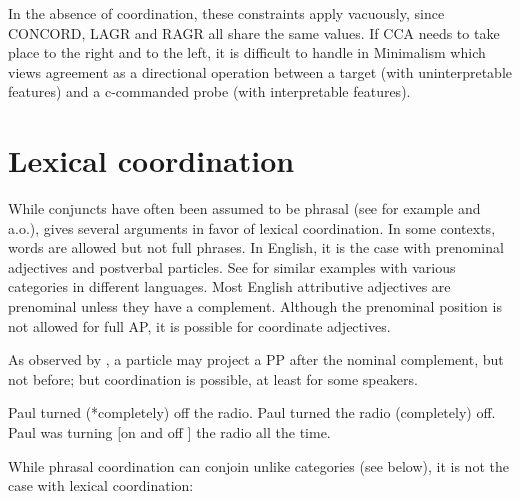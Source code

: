 \documentclass[output=paper
                ,modfonts
                ,nonflat
	        ,collection
	        ,collectionchapter
	        ,collectiontoclongg
 	        ,biblatex
                ,babelshorthands
                ,newtxmath
                ,draftmode
                ,colorlinks, citecolor=brown
]{./langsci/langscibook}
\begin{document}
\noindent
In the absence of coordination, these constraints apply vacuously, since CONCORD, LAGR and RAGR all share the same values.
If CCA needs to take place to the right and to the left, it is difficult to handle in Minimalism which views agreement as a directional operation between a target (with uninterpretable features) and a c-commanded probe (with interpretable features). 


\section{Lexical coordination}\label{lexcoord}


While conjuncts have often been assumed to be phrasal (see for example \citet{Kayne:94} and \citet{bruening} a.o.), \citet{Abeille:06} gives several arguments in favor of lexical coordination.
In some contexts, words are allowed but not full phrases. In English, it is the case with prenominal adjectives and postverbal particles. See \citet{Abeille:06} for similar examples with various categories in different languages. Most English attributive adjectives are prenominal unless they have a complement. Although the prenominal position is not allowed for full AP, it is possible for coordinate adjectives.

\begin{exe}
 \ex
\begin{xlista}
\end{xlista}
\end{exe}

As observed by \citet{hpsg1}, a particle may project a  PP  after the nominal complement, but not before; but coordination is possible, at least for some speakers.

\begin{exe}
 \ex
\begin{xlista}
\ex Paul turned (*completely) off the radio.
\ex Paul turned the radio (completely) off.
\ex Paul was turning [on and off ] the radio all the time.
\end{xlista}
\end{exe}

While phrasal coordination can conjoin unlike categories (see below), it is not the case with lexical coordination:

\begin{exe}
 \ex
\begin{xlista}
\end{xlista}
\end{exe}
\end{document}
